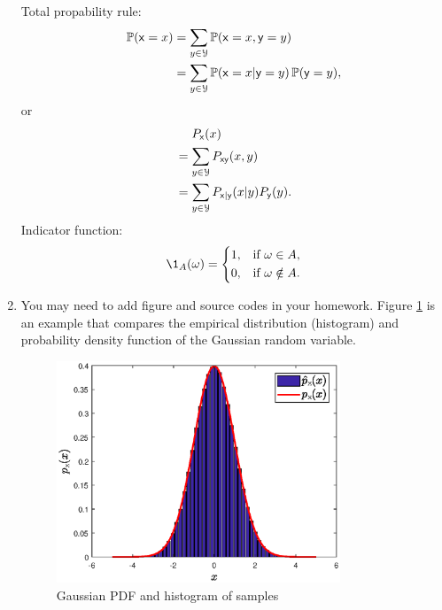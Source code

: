 \documentclass[a4paper]{article}
\begin{document}
\begin{enumerate}
    Total propability rule:
  \begin{equation*}
    \begin{aligned}
      \operatorname{\mathbb{P}}(\mathsf{x} = x)
      &= \sum_{y \in \mathcal{Y}} \operatorname{\mathbb{P}}(\mathsf{x} = x, \mathsf{y} = y)\\
      &= \sum_{y \in \mathcal{Y}} \operatorname{\mathbb{P}}(\mathsf{x} = x| \mathsf{y} = y) \operatorname{\mathbb{P}}(\mathsf{y} = y),\\
    \end{aligned}
  \end{equation*}
  or
  \begin{equation*}
    \begin{aligned}
      &\quad~  P_{\mathsf{x}}(x)\\
      &= \sum_{y \in \mathcal{Y}} P_{\mathsf{x}\mathsf{y}}(x,y)\\
      &= \sum_{y \in \mathcal{Y}} P_{\mathsf{x}|\mathsf{y}}(x|y)P_{\mathsf{y}}(y).\\
    \end{aligned}
  \end{equation*}
  Indicator function:
  \begin{equation*}
    \1_A(\omega)=
    \left\{
    \begin{aligned}
      1, &\quad\text{if}~ \omega \in A,\\
      0, &\quad\text{if}~ \omega \notin A.
    \end{aligned}
    \right.
  \end{equation*}

  \item You may need to add figure and source codes in your homework. Figure \ref{fig:1} is an example that compares the empirical distribution (histogram) and probability density function of the Gaussian random variable.
    \begin{figure}[htbp]
      \centering
      \includegraphics[width = 0.8\textwidth]{pdf_normal.eps}
      \caption{Gaussian PDF and histogram of samples}
      \label{fig:1}
    \end{figure}


\end{enumerate}
\end{document}
